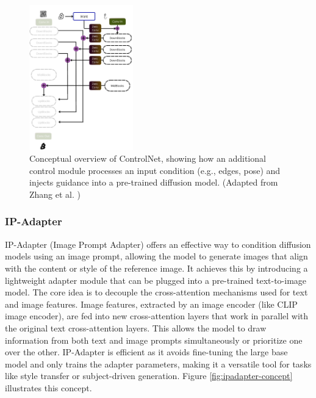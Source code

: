\begin{figure}[ht]
  \centering
  \includegraphics[width=0.4\textwidth]{images/related-work/controlnet.png}
  \caption{Conceptual overview of ControlNet, showing how an additional control module processes an input condition (e.g., edges, pose) and injects guidance into a pre-trained diffusion model. (Adapted from Zhang et al. \cite{controlnet})}
  \label{fig:controlnet-overview}
\end{figure}

\subsubsection{IP-Adapter}
IP-Adapter (Image Prompt Adapter) \cite{ipadapter} offers an effective way to condition diffusion models using an image prompt, allowing the model to generate images that align with the content or style of the reference image. It achieves this by introducing a lightweight adapter module that can be plugged into a pre-trained text-to-image model. The core idea is to decouple the cross-attention mechanisms used for text and image features. Image features, extracted by an image encoder (like CLIP \cite{clip} image encoder), are fed into new cross-attention layers that work in parallel with the original text cross-attention layers. This allows the model to draw information from both text and image prompts simultaneously or prioritize one over the other. IP-Adapter is efficient as it avoids fine-tuning the large base model and only trains the adapter parameters, making it a versatile tool for tasks like style transfer or subject-driven generation. Figure \ref{fig:ipadapter-concept} illustrates this concept.

